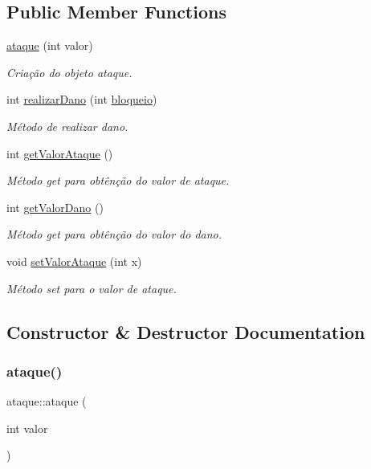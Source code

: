 \subsection*{Public Member Functions}
\begin{DoxyCompactItemize}
\item 
\mbox{\hyperlink{classataque_aa743f532bf31ac7541ce0963a838021c}{ataque}} (int valor)
\begin{DoxyCompactList}\small\item\em Criação do objeto ataque. \end{DoxyCompactList}\item 
int \mbox{\hyperlink{classataque_a431a441a9a11d651dba80b83f6a9a980}{realizar\+Dano}} (int \mbox{\hyperlink{classbloqueio}{bloqueio}})
\begin{DoxyCompactList}\small\item\em Método de realizar dano. \end{DoxyCompactList}\item 
int \mbox{\hyperlink{classataque_ae21cc54ec16f06614dedddb18d861fda}{get\+Valor\+Ataque}} ()
\begin{DoxyCompactList}\small\item\em Método get para obtênção do valor de ataque. \end{DoxyCompactList}\item 
int \mbox{\hyperlink{classataque_abbd99389ed66a4fdbfe994c3f1a102ec}{get\+Valor\+Dano}} ()
\begin{DoxyCompactList}\small\item\em Método get para obtênção do valor do dano. \end{DoxyCompactList}\item 
void \mbox{\hyperlink{classataque_a398d632b079837ca60dc838671d4614e}{set\+Valor\+Ataque}} (int x)
\begin{DoxyCompactList}\small\item\em Método set para o valor de ataque. \end{DoxyCompactList}\end{DoxyCompactItemize}


\subsection{Constructor \& Destructor Documentation}
\mbox{\label{classataque_aa743f532bf31ac7541ce0963a838021c}} 
\subsubsection{\texorpdfstring{ataque()}{ataque()}}
{\footnotesize\ttfamily ataque\+::ataque (\begin{DoxyParamCaption}\item[{int}]{valor }\end{DoxyParamCaption})}



